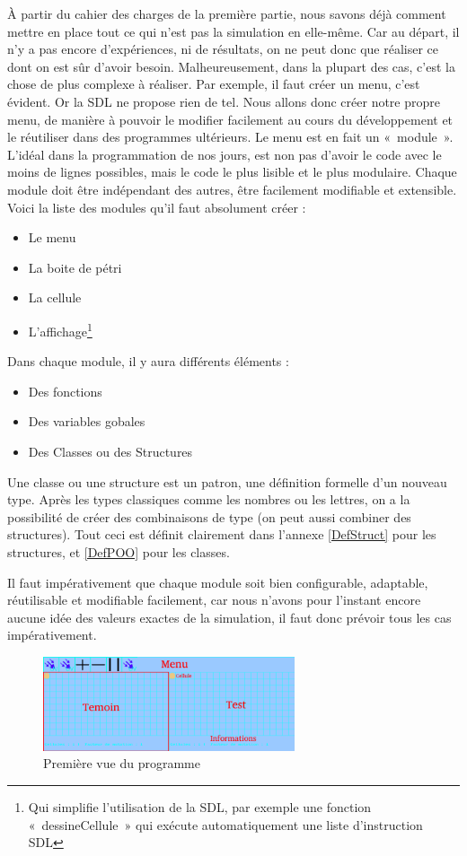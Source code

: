 À partir du cahier des charges de la première partie, nous savons déjà comment mettre en place tout ce qui 
  n'est pas la simulation en elle-même. Car au départ, il n'y a pas encore d'expériences, ni de résultats, on ne peut donc que réaliser ce dont on est sûr d'avoir besoin. Malheureusement, dans la plupart des cas, c'est la chose de plus complexe à réaliser.
  Par exemple, il faut créer un menu, c'est évident. Or la SDL ne propose rien de tel. Nous allons donc créer notre propre menu, de manière à pouvoir le modifier facilement au cours du développement et le réutiliser dans des programmes ultérieurs. Le menu est en fait un «~module~». L'idéal dans la programmation de nos jours, est non pas d'avoir le code avec le moins de lignes possibles, mais le code le plus lisible et le plus modulaire. Chaque module doit être indépendant des autres, être facilement modifiable et extensible.
  Voici la liste des modules qu'il faut absolument créer : 
  \begin{itemize}
    \item Le menu
    \item La boite de pétri
    \item La cellule
    \item L'affichage\footnote{Qui simplifie l'utilisation de la SDL, par exemple une fonction «~dessineCellule~» qui exécute automatiquement une liste d'instruction SDL}
  \end{itemize}
  
  Dans chaque module, il y aura différents éléments : 
    \begin{itemize}
      \item Des fonctions
      \item Des variables gobales
      \item Des Classes ou des Structures
    \end{itemize}
  Une classe ou une structure est un patron, une définition formelle d'un nouveau type.
  Après les types classiques comme les nombres ou les lettres, on a la possibilité de créer
  des combinaisons de type (on peut aussi combiner des structures). Tout ceci est définit 
  clairement dans l'annexe \ref{DefStruct} pour les structures, et \ref{DefPOO} pour les
  classes.
  
  Il faut impérativement que chaque module soit bien configurable, adaptable, réutilisable et modifiable facilement, car nous n'avons pour l'instant encore aucune idée des valeurs exactes de la simulation, il faut donc prévoir tous les cas impérativement.
  
  \begin{figure}[H]
		\centering
		\includegraphics[width=20em]{Images/capture.png}
		\caption{Première vue du programme}
	\end{figure}
